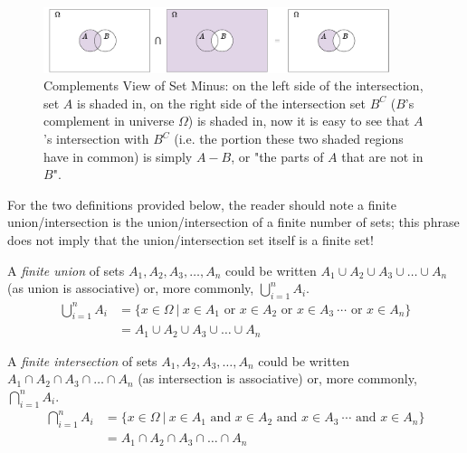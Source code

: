 \begin{figure}[h!]
    \centering
    \includegraphics[width=0.9\textwidth]{Figures/Complements View of Set Minus.pdf}
    \caption{Complements View of Set Minus: on the left side of the intersection, set $A$ is shaded in, on the right side of the intersection set $B^C$ ($B$'s complement in universe $\Omega$) is shaded in, now it is easy to see that $A$'s intersection with $B^C$ (i.e. the portion these two shaded regions have in common) is simply $A-B$, or "the parts of $A$ that are not in $B$".}
    \label{fig:complements_view_set_minus}
\end{figure}
\newpage
\noindent For the two definitions provided below, the reader should note a finite union/intersection is the union/intersection of a finite number of sets; this phrase does not imply that the union/intersection set itself is a finite set!

\begin{definition}
    A \textit{finite union} of sets $A_1, A_2, A_3, \dots , A_n$ could be written $A_1 \cup A_2 \cup A_3 \cup \dots \cup A_n$ (as union is associative) or, more commonly, $\bigcup_{i=1}^n A_i$. 
\begin{align}
    \bigcup_{i=1}^n A_i &= \{x\in \Omega \ | \ x\in A_1 \text{ or } x \in A_2 \text{ or } x\in A_3 \  \cdots \text{ or } x\in A_n\} \nonumber \\
    &= A_1 \cup A_2 \cup A_3 \cup \dots \cup A_n \nonumber 
\end{align}
\end{definition}

\begin{definition}
    A \textit{finite intersection} of sets $A_1, A_2, A_3, \dots , A_n$ could be written $A_1 \cap A_2 \cap A_3 \cap \dots \cap A_n$ (as intersection is associative) or, more commonly, $\bigcap_{i=1}^n A_i$. 
\begin{align}
    \bigcap_{i=1}^n A_i &= \{x\in \Omega \ | \ x\in A_1 \text{ and } x \in A_2 \text{ and } x\in A_3 \ \cdots \text{ and } x\in A_n\} \nonumber \\
    &= A_1 \cap A_2 \cap A_3 \cap \dots \cap A_n \nonumber 
\end{align}
\end{definition}

